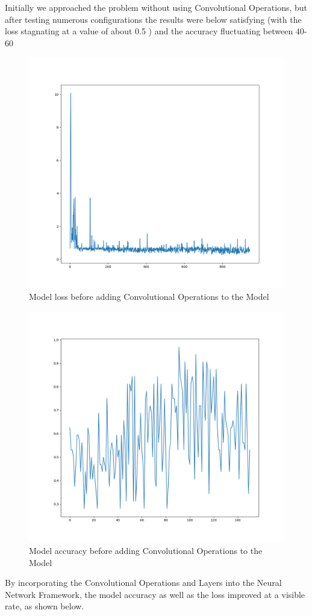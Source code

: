 Initially we approached the problem without using Convolutional Operations, but after testing numerous configurations
the results were below satisfying (with the loss stagnating at a value of about 0.5 ) and the accuracy fluctuating between
40-60%


\begin{figure}[H]
	\centering
	\includegraphics[width = 5.5in]{images/badmetricspng.png}
	\caption{Model loss before adding Convolutional Operations to the Model}
\label{bad_metrics}
\end{figure}


\begin{figure}[H]
	\centering
	\includegraphics[width = 5.5in]{images/badacc.png}
	\caption{Model accuracy before adding Convolutional Operations to the Model}
\label{bad_metrics2}
\end{figure}
By incorporating the Convolutional Operations and Layers into the Neural Network Framework, the model accuracy as well
as the loss improved at a visible rate, as shown below.


